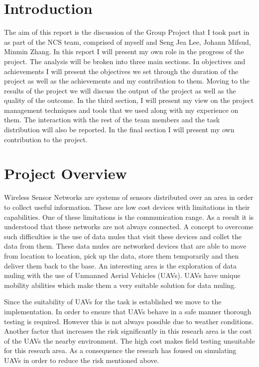 





\tableofcontents{}

\pagebreak

\section{Introduction}
The aim of this report is the discussion of the Group Project that I took part
in as part of the NCS team, comprised of myself and Seng Jea Lee, Johann Mifsud,
Minmin Zhang. In this report I will present my own role in the progress of
the project. The analysis will be broken into three main sections. In objectives
and achievements I will present the objectives we set through the duration of
the project as well as the achievements and my contribution to them. Moving to
the results of the project we will discuss the output of the project as well as
the quality of the outcome. In the third section, I will present my view on the
project management techniques and tools that we used along with my experience on
them. The interaction with the rest of the team members and the task
distribution will also be reported. In the final section I will present my own
contribution to the project.

\section{Project Overview}
Wireless Sensor Networks are systems of sensors distributed over an area in
order to collect useful information. These are low cost devices with limitations
in their capabilities. One of these limitations is the communication range. As a
result it is understood that these networks are not always connected. A concept
to overcome such difficulties is the use of data mules that visit these devices
and collet the data from them. These data mules are networked devices that are
able to move from location to location, pick up the data, store them
temporarily and then deliver them back to the base. An interesting area is the
exploration of data muling with the use of Unmanned Aerial Vehicles (UAVs).
UAVs have unique mobility abilities which make them a very suitable solution
for data muling.

Since the suitability of UAVs for the task is established we move to the
implementation. In order to ensure that UAVs behave in a safe manner thorough
testing is required. However this is not always possible due to weather
conditions. Another factor that increases the risk significantly in this
researh area is the cost of the UAVs the nearby environment. The high cost
makes field testing unsuitable for this researh area. As a consequence the
researh has foused on simulating UAVs in order to reduce the risk mentioned
above.

